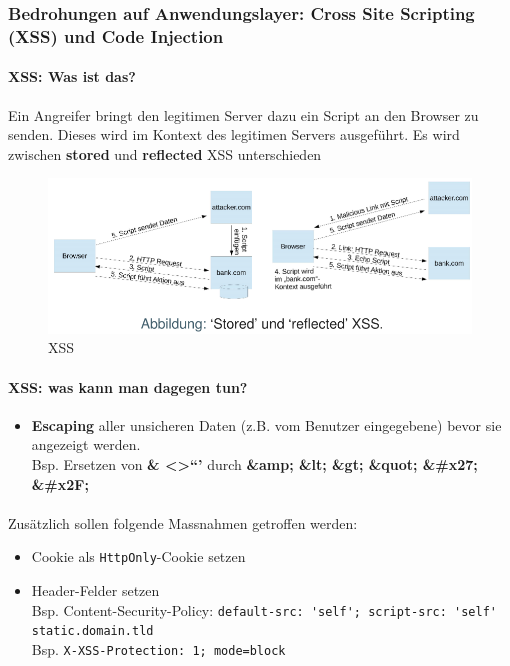 \documentclass[10pt,a4paper]{article}
\begin{document}
\subsubsection*{Bedrohungen auf Anwendungslayer: Cross Site Scripting (XSS) und Code Injection}
\paragraph*{XSS: Was ist das?}Ein Angreifer bringt den legitimen Server dazu ein Script an den Browser zu senden. Dieses wird im Kontext des legitimen Servers ausgeführt. Es wird zwischen \textbf{stored} und \textbf{reflected} XSS unterschieden
\begin{figure}[H]
    \begin{center}
    \includegraphics[width=15cm]{images/XSS.png}
    \caption{XSS}
    \label{XSS}
    \end{center}
\end{figure}

\paragraph*{XSS: was kann man dagegen tun?}
\begin{itemize}[noitemsep,topsep=0pt,leftmargin=*]
    \item \textbf {Escaping} aller unsicheren Daten (z.B. vom Benutzer eingegebene) bevor sie angezeigt werden.\\ Bsp. Ersetzen von \textbf{\& \textless \textgreater \textquotedblleft \textquoteright} durch \textbf{\&amp; \&lt; \&gt; \&quot; \&\#x27; \&\#x2F;}
\end{itemize}
\paragraph*{}Zusätzlich sollen folgende Massnahmen getroffen werden:
\begin{itemize}[noitemsep,topsep=0pt,leftmargin=*]
    \item Cookie als \texttt{HttpOnly}-Cookie setzen
    \item Header-Felder setzen\\ Bsp. Content-Security-Policy: \verb|default-src: 'self'; script-src: 'self' static.domain.tld| \\ Bsp. \verb|X-XSS-Protection: 1; mode=block|
\end{itemize}
\end{document}

